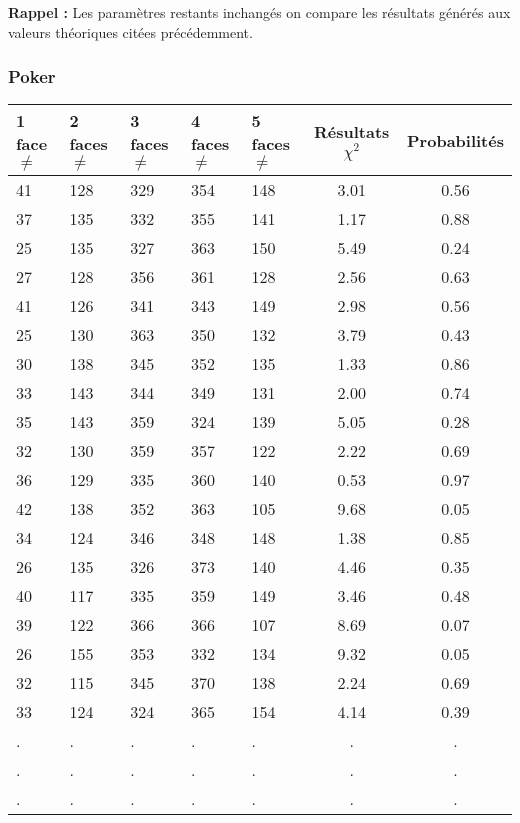\documentclass[12pt,a4paper]{article}
\begin{document}
\textbf{Rappel :} Les paramètres restants inchangés on compare les résultats générés aux valeurs théoriques citées précédemment.
\subsubsection{Poker}

\begin{center}
\begin{tabular}{|l|l|l|l|l|c|c|}
\hline
1 face $\neq$ & 2 faces $\neq$  & 3 faces $\neq$ & 4 faces $\neq$ & 5 faces $\neq$ & Résultats $\chi^2$ & Probabilités \\
\hline \hline
41 & 128 & 329 & 354 & 148 &  3.01 &  0.56\\ \hline
37 & 135 & 332 & 355 & 141 &  1.17 &  0.88\\ \hline
25 & 135 & 327 & 363 & 150 &  5.49 &  0.24\\ \hline
27 & 128 & 356 & 361 & 128 &  2.56 &  0.63\\ \hline
41 & 126 & 341 & 343 & 149 &  2.98 &  0.56\\ \hline
25 & 130 & 363 & 350 & 132 &  3.79 &  0.43\\ \hline
30 & 138 & 345 & 352 & 135 &  1.33 &  0.86\\ \hline
33 & 143 & 344 & 349 & 131 &  2.00 &  0.74\\ \hline
35 & 143 & 359 & 324 & 139 &  5.05 &  0.28\\ \hline
32 & 130 & 359 & 357 & 122 &  2.22 &  0.69\\ \hline
36 & 129 & 335 & 360 & 140 &  0.53 &  0.97\\ \hline
42 & 138 & 352 & 363 & 105 &  9.68 &  0.05\\ \hline
34 & 124 & 346 & 348 & 148 &  1.38 &  0.85\\ \hline
26 & 135 & 326 & 373 & 140 &  4.46 &  0.35\\ \hline
40 & 117 & 335 & 359 & 149 &  3.46 &  0.48\\ \hline
39 & 122 & 366 & 366 & 107 &  8.69 &  0.07\\ \hline
26 & 155 & 353 & 332 & 134 &  9.32 &  0.05\\ \hline
32 & 115 & 345 & 370 & 138 &  2.24 &  0.69\\ \hline
33 & 124 & 324 & 365 & 154 &  4.14 &  0.39\\ \hline
 . & . & . & . & . & . & . \\ \hline
 . & . & . & . & . & . & . \\ \hline
 . & . & . & . & . & . & . \\ \hline

\end{tabular}
\end{center}
\end{document}
